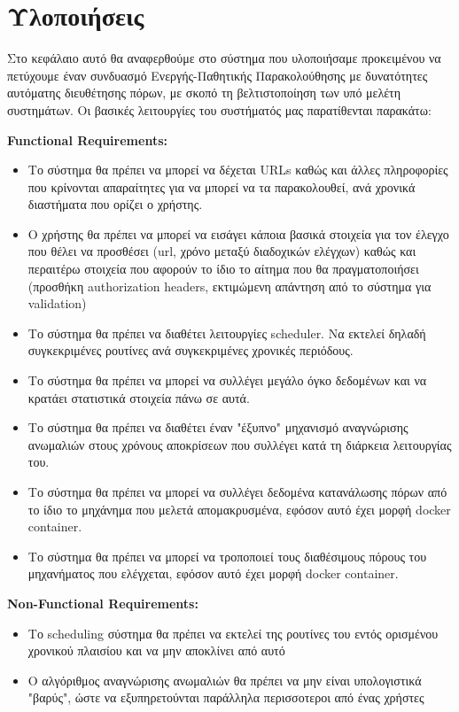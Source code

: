 \chapter{Υλοποιήσεις}
\label{chapter:implementations}

Στο κεφάλαιο αυτό θα αναφερθούμε στο σύστημα που υλοποιήσαμε προκειμένου να πετύχουμε έναν συνδυασμό Ενεργής-Παθητικής Παρακολούθησης με δυνατότητες αυτόματης διευθέτησης πόρων, με σκοπό τη βελτιστοποίηση των υπό μελέτη συστημάτων. Οι βασικές λειτουργίες του συστήματός μας παρατίθενται παρακάτω:\newline

\textbf{Functional Requirements:}
\begin{itemize}
    \item Το σύστημα θα πρέπει να μπορεί να δέχεται URLs καθώς και άλλες πληροφορίες που κρίνονται απαραίτητες για να μπορεί να τα παρακολουθεί, ανά χρονικά διαστήματα που ορίζει ο χρήστης.
    \item Ο χρήστης θα πρέπει να μπορεί να εισάγει κάποια βασικά στοιχεία για τον έλεγχο που θέλει να προσθέσει (url, χρόνο μεταξύ διαδοχικών ελέγχων) καθώς και περαιτέρω στοιχεία που αφορούν το ίδιο το αίτημα που θα πραγματοποιήσει (προσθήκη authorization headers, εκτιμώμενη απάντηση από το σύστημα για validation) 
    \item Το σύστημα θα πρέπει να διαθέτει λειτουργίες scheduler. Να εκτελεί δηλαδή συγκεκριμένες ρουτίνες ανά συγκεκριμένες χρονικές περιόδους.
    \item Το σύστημα θα πρέπει να μπορεί να συλλέγει μεγάλο όγκο δεδομένων και να κρατάει στατιστικά στοιχεία πάνω σε αυτά.
    \item Το σύστημα θα πρέπει να διαθέτει έναν "έξυπνο" μηχανισμό αναγνώρισης ανωμαλιών στους χρόνους αποκρίσεων που συλλέγει κατά τη διάρκεια λειτουργίας του.
    \item Το σύστημα θα πρέπει να μπορεί να συλλέγει δεδομένα κατανάλωσης πόρων από το ίδιο το μηχάνημα που μελετά απομακρυσμένα, εφόσον αυτό έχει μορφή docker container.
    \item Το σύστημα θα πρέπει να μπορεί να τροποποιεί τους διαθέσιμους πόρους του μηχανήματος που ελέγχεται, εφόσον αυτό έχει μορφή docker container.
\end{itemize}

\textbf{Non-Functional Requirements:}
\begin{itemize}
    \item Το scheduling σύστημα θα πρέπει να εκτελεί της ρουτίνες του εντός ορισμένου χρονικού πλαισίου και να μην αποκλίνει από αυτό
    \item Ο αλγόριθμος αναγνώρισης ανωμαλιών θα πρέπει να μην είναι υπολογιστικά "βαρύς", ώστε να εξυπηρετούνται παράλληλα περισσοτεροι από ένας χρήστες
\end{itemize}\mbox{}\\

